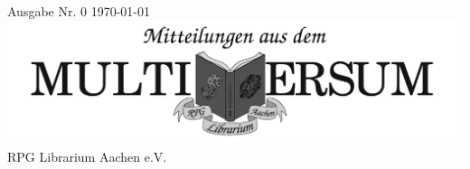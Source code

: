 \documentclass[a4paper,10pt]{article}
\author{Hanna Franzen}
\newcommand{\Datum}{\monthyear \today}
\begin{document}
%    
%    

{\small Ausgabe Nr. 0} \hfill {\small \Datum} \\
{\centering\includegraphics[width=\textwidth]{Ueberschrift1.pdf}} \\
{\normalsize RPG Librarium Aachen e.V.} 

\begin{multicols}{2}

\lipsum[1-10]

\end{multicols}
\end{document}
